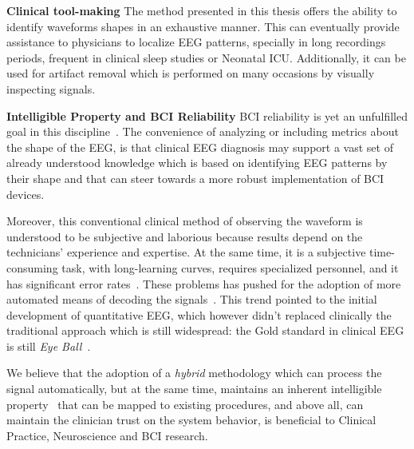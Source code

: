 \textbf{Clinical tool-making}
The method presented in this thesis offers the ability to identify waveforms shapes in an exhaustive manner.  This can eventually provide assistance to physicians to localize EEG patterns, specially in long recordings periods, frequent in clinical sleep studies or Neonatal ICU.  Additionally, it can be used for artifact removal which is performed on many occasions by visually inspecting signals. %


\textbf{Intelligible Property and BCI Reliability}
BCI reliability is yet an unfulfilled goal in this discipline~\cite{WolpawJonathanR2012}. The convenience of analyzing or including metrics about the shape of the EEG, is that clinical EEG diagnosis may support a vast set of already understood knowledge which is based on identifying EEG patterns by their shape and that can steer towards a more robust implementation of BCI devices.  


Moreover, this conventional clinical method of observing the waveform is understood to be subjective and laborious because results depend on the technicians' experience and expertise.   At the same time, it is a subjective time-consuming task, with long-learning curves, requires specialized personnel, and it has significant error rates~\cite{Tjepkema-Cloostermans2018}.  These problems has pushed for the adoption of more automated means of decoding the signals~\cite{Thakor2004}.   This trend pointed to the initial development of quantitative EEG, which however didn't replaced clinically the traditional approach which is still widespread: the Gold standard in clinical EEG is still \textit{Eye Ball}~\cite{Wulsin2011,Tjepkema-Cloostermans2018}.  

We believe that the adoption of a \textit{hybrid} methodology which can process the signal automatically, but at the same time, maintains an inherent intelligible property~\cite{j2018challenge} that can be mapped to existing procedures, and above all, can maintain the clinician trust on the system behavior, is beneficial to Clinical Practice, Neuroscience and BCI research. 


